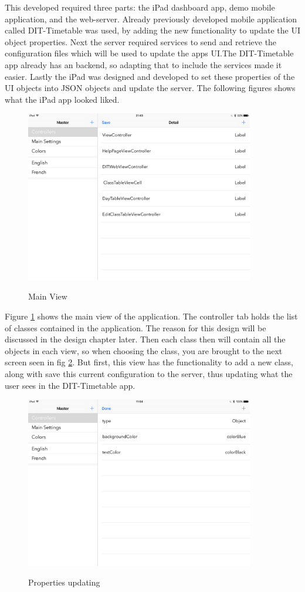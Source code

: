 This developed required three parts: the iPad dashboard app, demo mobile application, and the web-server. Already previously developed mobile application called DIT-Timetable was used, by adding the new functionality to update the UI object properties. Next the server required services to send and retrieve the configuration files which will be used to update the apps UI.The DIT-Timetable app already has an backend, so adapting that to include the services made it easier. Lastly the iPad was designed and developed to set these properties of the UI objects into JSON objects and update the server. The following figures shows what the iPad app looked liked.

\begin{figure}[!h]
    \caption{Main View}
    \centering
    \includegraphics[width=100mm]{images/ipad-images/mainview}
    \label{fig:mainview}
\end{figure}

Figure \ref{fig:mainview} shows the main view of the application. The controller tab holds the list of classes contained in the application. The reason for this design will be discussed in the design chapter later. Then each class then will contain all the objects in each view, so when choosing the class, you are brought to the next screen seen in fig \ref{fig:update-config}. But first, this view has the functionality to add a new class, along with save this current configuration to the server, thus updating what the user sees in the DIT-Timetable app.

\begin{figure}[h]
    \caption{Properties updating}
    \centering
    \includegraphics[width=100mm]{images/ipad-images/update}
    \label{fig:update-config}
\end{figure}

